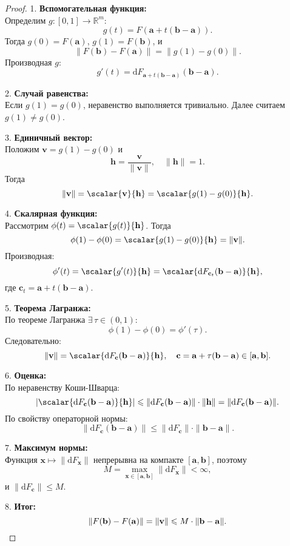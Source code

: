 \begin{proof}
1. \textbf{Вспомогательная функция:} \\
Определим $g: [0, 1] \to \mathbb{R}^m$:
\[
g(t) = F(\mathbf{a} + t(\mathbf{b} - \mathbf{a})).
\]
Тогда $g(0) = F(\mathbf{a})$, $g(1) = F(\mathbf{b})$, и
\[
\| F(\mathbf{b}) - F(\mathbf{a}) \| = \| g(1) - g(0) \|.
\]
Производная $g$:
\[
g'(t) = \mathrm{d}F_{\mathbf{a} + t(\mathbf{b} - \mathbf{a})}(\mathbf{b} - \mathbf{a}).
\]

2. \textbf{Случай равенства:} \\
Если $g(1) = g(0)$, неравенство выполняется тривиально. Далее считаем $g(1) \neq g(0)$.

3. \textbf{Единичный вектор:} \\
Положим $\mathbf{v} = g(1) - g(0)$ и
\[
\mathbf{h} = \frac{\mathbf{v}}{\| \mathbf{v} \|}, \quad \| \mathbf{h} \| = 1.
\]
Тогда
\[
\| \mathbf{v} \| = \scalar{\mathbf{v}}{\mathbf{h}} = \scalar{g(1) - g(0)}{\mathbf{h}}.
\]

4. \textbf{Скалярная функция:} \\
Рассмотрим $\phi(t) = \scalar{g(t)}{\mathbf{h}}$. Тогда
\[
\phi(1) - \phi(0) = \scalar{g(1) - g(0)}{\mathbf{h}} = \| \mathbf{v} \|.
\]
Производная:
\[
\phi'(t) = \scalar{g'(t)}{\mathbf{h}} = \scalar{\mathrm{d}F_{\mathbf{c}_t}(\mathbf{b} - \mathbf{a})}{\mathbf{h}},
\]
где $\mathbf{c}_t = \mathbf{a} + t(\mathbf{b} - \mathbf{a})$.

5. \textbf{Теорема Лагранжа:} \\
По теореме Лагранжа $\exists\, \tau \in (0,1)$:
\[
\phi(1) - \phi(0) = \phi'(\tau).
\]
Следовательно:
\[
\| \mathbf{v} \| = \scalar{\mathrm{d}F_{\mathbf{c}}(\mathbf{b} - \mathbf{a})}{\mathbf{h}}, \quad \mathbf{c} = \mathbf{a} + \tau(\mathbf{b} - \mathbf{a}) \in [\mathbf{a}, \mathbf{b}].
\]

6. \textbf{Оценка:} \\
По неравенству Коши-Шварца:
\[
\left| \scalar{\mathrm{d}F_{\mathbf{c}}(\mathbf{b} - \mathbf{a})}{\mathbf{h}} \right| \leqslant \| \mathrm{d}F_{\mathbf{c}}(\mathbf{b} - \mathbf{a}) \| \cdot \| \mathbf{h} \| = \| \mathrm{d}F_{\mathbf{c}}(\mathbf{b} - \mathbf{a}) \|.
\]
По свойству операторной нормы:
\[
\| \mathrm{d}F_{\mathbf{c}}(\mathbf{b} - \mathbf{a}) \| \leqslant \| \mathrm{d}F_{\mathbf{c}} \| \cdot \| \mathbf{b} - \mathbf{a} \|.
\]

7. \textbf{Максимум нормы:} \\
Функция $\mathbf{x} \mapsto \| \mathrm{d}F_{\mathbf{x}} \|$ непрерывна на компакте $[\mathbf{a}, \mathbf{b}]$, поэтому
\[
M = \max_{\mathbf{x} \in [\mathbf{a}, \mathbf{b}]} \| \mathrm{d}F_{\mathbf{x}} \| < \infty,
\]
и $\| \mathrm{d}F_{\mathbf{c}} \| \leqslant M$.

8. \textbf{Итог:} \\
\[
\| F(\mathbf{b}) - F(\mathbf{a}) \| = \| \mathbf{v} \| \leqslant M \cdot \| \mathbf{b} - \mathbf{a} \|.\qedhere
\]
\end{proof}






